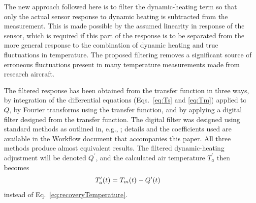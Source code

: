 \documentclass[amt, manuscript]{copernicus}
\begin{document}
The new approach followed here is to filter the dynamic-heating term so
that only the actual sensor response to dynamic heating is subtracted
from the measurement. This is made possible by the assumed linearity in
response of the sensor, which is required if this part of the response
is to be separated from the more general response to the combination of
dynamic heating and true fluctuations in temperature. The proposed
filtering removes a significant source of erroneous fluctuations present
in many temperature measurements made from research aircraft.

The filtered response has been obtained from the transfer function in
three ways, by integration of the differential equations
(Eqs.~\eqref{eq:Ts} and \eqref{eq:Tm}) applied to \(Q\), by Fourier
transforms using the transfer function, and by applying a digital filter
designed from the transfer function. The digital filter was designed
using standard methods as outlined in, e.g.,
\citet{Press:1992:NRC:148286}; details and the coefficients used are
available in the Workflow document that accompanies this paper. All
three methods produce almost equivalent results. The filtered
dynamic-heating adjustment will be denoted \(Q^{\prime}\), and the
calculated air temperature \(T_a^\prime\) then becomes \begin{equation}
T^{\prime}_{a}(t)=T_{m}(t)-Q^{\prime}(t){\label{eq:QprimeCorr}}
\end{equation} instead of Eq.~\eqref{eq:recoveryTemperature}.
\end{document}
